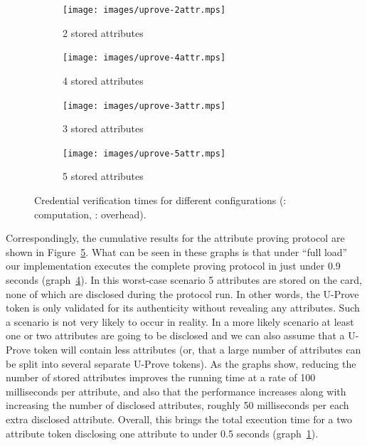 \begin{figure}[hbt]
  \centering
  \begin{subfigure}[b]{0.4\textwidth}
    \texttt{[image: images/uprove-2attr.mps]}
    \caption{2 stored attributes}
    \label{fig:2attr}
  \end{subfigure}
  \begin{subfigure}[b]{0.5\textwidth}
    \texttt{[image: images/uprove-4attr.mps]}
    \caption{4 stored attributes}
    \label{fig:4attr}
  \end{subfigure}

  \vspace{5mm}

  \begin{subfigure}[b]{0.4\textwidth}
    \texttt{[image: images/uprove-3attr.mps]}
    \caption{3 stored attributes}
    \label{fig:3attr}
  \end{subfigure}
  \begin{subfigure}[b]{0.5\textwidth}
    \texttt{[image: images/uprove-5attr.mps]}
    \caption{5 stored attributes}
    \label{fig:5attr}
  \end{subfigure}

  \caption[Credential verification times for different configurations.]{
    Credential verification times for different configurations
    (: computation,
      : overhead).}
  \label{fig:total}
\end{figure}

Correspondingly, the cumulative results for the attribute proving protocol are
shown in Figure~\ref{fig:total}. What can be seen in these graphs is that under
``full load'' our implementation executes the complete proving protocol in just
under 0.9 seconds (graph~\ref{fig:5attr}). In this worst-case scenario 5
attributes are stored on the card, none of which are disclosed during the
protocol run. In other words, the U-Prove token is only validated for its
authenticity without revealing any attributes. Such a scenario is not very
likely to occur in reality. In a more likely scenario at least one or two
attributes are going to be disclosed and we can also assume that a U-Prove token
will contain less attributes (or, that a large number of attributes can be split
into several separate U-Prove tokens). As the graphs show, reducing the number
of stored attributes improves the running time at a rate of 100 milliseconds per
attribute, and also that the performance increases along with increasing the
number of disclosed attributes, roughly 50 milliseconds per each extra disclosed
attribute. Overall, this brings the total execution time for a two attribute
token disclosing one attribute to under 0.5 seconds (graph~\ref{fig:2attr}).

